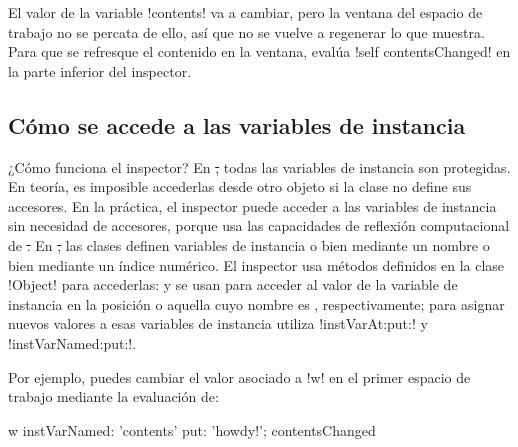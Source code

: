 \documentclass[a4paper,10pt,twoside]{book}
\begin{document}

El valor de la variable \ct!contents! va a cambiar, pero la ventana
del espacio de trabajo no se percata de ello, as\'i que no se vuelve a
regenerar lo que muestra.  Para que se refresque el contenido en la
ventana, eval\'ua \ct!self contentsChanged!  en la parte inferior del
inspector.

\subsection{C\'omo se accede a las variables de instancia}


¿C\'omo funciona el inspector?  En \st, todas las variables de instancia
son protegidas.  En teor\'ia, es imposible accederlas desde otro objeto
si la clase no define sus accesores.  En la pr\'actica, el
inspector puede acceder a las variables de instancia sin necesidad de
accesores, porque usa las capacidades de reflexi\'on computacional de
\st.  En \st, las clases definen variables de instancia o bien
mediante un nombre o bien mediante un \'indice num\'erico.  El inspector
usa m\'etodos definidos en la clase \ct!Object! para accederlas:
 y  se
usan para acceder al valor de la variable de instancia en la posici\'on
 o aquella cuyo nombre es ,
respectivamente; para asignar nuevos valores a esas variables de
instancia utiliza \ct!instVarAt:put:! y \ct!instVarNamed:put:!.
 
 

Por ejemplo, puedes cambiar el valor asociado a \ct!w! en el primer
espacio de trabajo mediante la evaluaci\'on de:
\begin{code}{}
w instVarNamed: 'contents' put: 'howdy!'; contentsChanged
\end{code}

\end{document}
